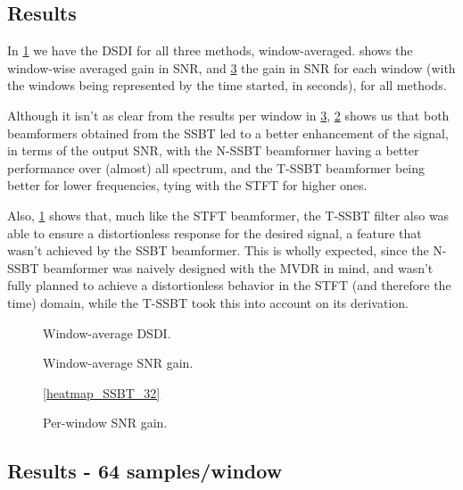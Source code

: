 \subsection{Results}

In \cref{fig:lineplot_dsdi_32} we have the DSDI for all three methods, window-averaged.  shows the window-wise averaged gain in SNR, and \cref{fig:heatmap_gain_32} the gain in SNR for each window (with the windows being represented by the time started, in seconds), for all methods.

Although it isn't as clear from the results per window in \cref{fig:heatmap_gain_32}, \cref{fig:lineplot_gain_32} shows us that both beamformers obtained from the SSBT led to a better enhancement of the signal, in terms of the output SNR, with the N-SSBT beamformer having a better performance over (almost) all spectrum, and the T-SSBT beamformer being better for lower frequencies, tying with the STFT for higher ones.

Also, \cref{fig:lineplot_dsdi_32} shows that, much like the STFT beamformer, the T-SSBT filter also was able to ensure a distortionless response for the desired signal, a feature that wasn't achieved by the SSBT beamformer. This is wholly expected, since the N-SSBT beamformer was naively designed with the MVDR in mind, and wasn't fully planned to achieve a distortionless behavior in the STFT (and therefore the time) domain, while the T-SSBT took this into account on its derivation.



\begin{figure}[H]
	\centering
	
	\caption{Window-average DSDI.}
	\label{fig:lineplot_dsdi_32}
\end{figure}

\begin{figure}[H]
	\centering
	
	\caption{Window-average SNR gain.}
	\label{fig:lineplot_gain_32}
\end{figure}

\begin{figure}[H]
	\centering
	
	
	\vspace*{0.4em}
	\ref*{heatmap_SSBT_32}
	\caption{Per-window SNR gain.}
	\label{fig:heatmap_gain_32}
\end{figure}
%
\subsection{Results - 64 samples/window}

